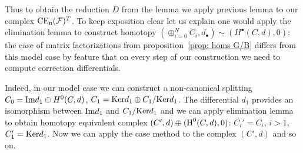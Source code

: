 Thus to obtain the reduction $\bar{D}$ from the lemma we apply previous lemma to our complex $\mathrm{CE}_{\mathfrak{n}}(\mathcal{F})^T$. To keep exposition clear let us explain one would apply
the elimination lemma to construct homotopy $(\oplus_{i=0}^N C_i, d_\bullet)\sim (H^\bullet(C,d),0)$: the case of matrix factorizations from proposition~\ref{prop: homs G/B} differs from this model case
by feature that on every step of our construction we need to compute correction differentials.

Indeed, in our model case we can construct a non-canonical splitting
$C_0=\textup{Im} d_1\oplus H^0(C,d)$, $C_1=\mathrm{Ker} d_1\oplus C_1/\mathrm{Ker} d_1$. The differential $d_1$ provides an isomorphism between $\textup{Im} d_1$ and $C_1/\mathrm{Ker} d_1$ and we can apply elimination lemma to
obtain homotopy equivalent complex $(C',d)\oplus (\textup{H}^0(C,d),0)$: $C_i'=C_i$, $i>1$, $C'_1=\mathrm{Ker} d_1$. Now we can apply the case method to the complex $(C',d)$ and so on.






